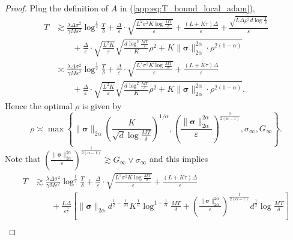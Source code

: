 \documentclass{article} %
\numberwithin{equation}{section}
\renewcommand{\eqref}[1]{(\ref{#1})}
\begin{document}
\begin{proof}
    Plug the definition of $A$ in \eqref{app:eq:T_bound_local_adam},
    \begin{equation}
        \begin{aligned}
            T
            &\gtrsim \frac{\lambda\Delta\sigma^2}{\gamma M\varepsilon^2}\log^{\frac{1}{2}}\frac{T}{\delta} + \frac{\Delta}{\varepsilon}\cdot \sqrt{\frac{L^2\sigma^2K\log\frac{MT}{\delta}}{\varepsilon}} + \frac{(L+K\tau)\Delta}{\varepsilon} + \frac{\sqrt{L\Delta\rho^2d\log\frac{T}{\delta}}}{\varepsilon} \\
            &\qquad + \frac{\Delta}{\varepsilon}\cdot \sqrt{\frac{L^2K}{\varepsilon}}\sqrt{\frac{d\log^2\frac{MT}{\delta}}{K}\rho^2+K\|\boldsymbol{\sigma}\|_{2\alpha}^{2\alpha}\cdot\rho^{2(1-\alpha)}} \\
            &\asymp \frac{\lambda\Delta\sigma^2}{\gamma M\varepsilon^2}\log^{\frac{1}{2}}\frac{T}{\delta} + \frac{\Delta}{\varepsilon}\cdot \sqrt{\frac{L^2\sigma^2K\log\frac{MT}{\delta}}{\varepsilon}} + \frac{(L+K\tau)\Delta}{\varepsilon} \\
            &\qquad + \frac{\Delta}{\varepsilon}\cdot \sqrt{\frac{L^2K}{\varepsilon}}\sqrt{\frac{d\log^2\frac{MT}{\delta}}{K}\rho^2+K\|\boldsymbol{\sigma}\|_{2\alpha}^{2\alpha}\cdot\rho^{2(1-\alpha)}}.
        \end{aligned}
    \end{equation}
    Hence the optimal $\rho$ is given by 
    \begin{equation}\label{app:eq:def_rho}
        \rho\asymp \max\left\{\|\boldsymbol{\sigma}\|_{2\alpha}\left(\frac{K}{\sqrt{d}\log\frac{MT}{\delta}}\right)^{1/\alpha}, \left(\frac{\|\boldsymbol{\sigma}\|_{2\alpha}^{2\alpha}}{\varepsilon}\right)^{\frac{1}{2(\alpha-1)}}, \sigma_\infty, G_{\infty}\right\}.
    \end{equation}
    Note that $\left(\frac{\|\boldsymbol{\sigma}\|_{2\alpha}^{2\alpha}}{\varepsilon}\right)^{\frac{1}{2(\alpha-1)}}\gtrsim G_\infty\vee \sigma_\infty$ and this implies 
    \begin{equation}
        \begin{aligned}
            T
            &\gtrsim \frac{\lambda\Delta\sigma^2}{\gamma M\varepsilon^2}\log^{\frac{1}{2}}\frac{T}{\delta} + \frac{\Delta}{\varepsilon}\cdot \sqrt{\frac{L^2\sigma^2K\log\frac{MT}{\delta}}{\varepsilon}} + \frac{(L+K\tau)\Delta}{\varepsilon} \\
            &\qquad + \frac{L\Delta}{\varepsilon^{\frac{3}{2}}}\left[\|\boldsymbol{\sigma}\|_{2\alpha}d^{\frac{1}{2}-\frac{1}{2\alpha}}K^{\frac{1}{\alpha}}\log^{1-\frac{1}{\alpha}}\frac{MT}{\delta} + \left(\frac{\|\boldsymbol{\sigma}\|_{2\alpha}^{2\alpha}}{\varepsilon}\right)^{\frac{1}{2(\alpha-1)}}d^{\frac{1}{2}}\log\frac{MT}{\delta}\right] \\

\end{aligned}
\end{equation}
\end{proof}
\end{document}
